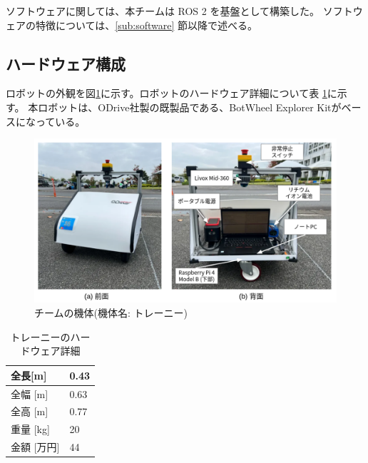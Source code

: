 \documentclass[twocolumn,9pt]{jsproceedings}
\begin{document}
ソフトウェアに関しては、本チームは ROS 2 \cite{ROS 2} を基盤として構築した。
ソフトウェアの特徴については、\ref{sub:software} 節以降で述べる。


\subsection{ハードウェア構成}\label{sub:hardware}
ロボットの外観を図\ref{fig:trainee}に示す。ロボットのハードウェア詳細について表
\ref{table:tarainee_hardware_syousai}に示す。
本ロボットは、ODrive社製の既製品である、BotWheel Explorer Kit\cite{odrive}がベースになっている。

\begin{figure}[h]
  \begin{center}
    \includegraphics[width=1.0\linewidth]{figs/trainee.pdf}
    \caption{チームの機体(機体名: トレーニー)}
    \label{fig:trainee}
  \end{center}
\end{figure}

\begin{table}[H]
  \centering
  \caption{トレーニーのハードウェア詳細}
  \label{table:tarainee_hardware_syousai}
	  \begin{tabular}{|p{3.0cm}|l|}
    \hline
    全長[m] & 0.43\\ 
    \hline
    全幅 [m] & 0.63 \\ 
    \hline
    全高 [m] & 0.77 \\ 
    \hline
    重量 [kg] & 20 \\ 
    \hline
    金額 [万円] & 44 \\ 
    \hline
  \end{tabular}
\end{table}
\end{document}
